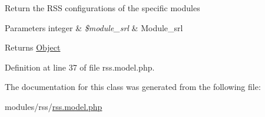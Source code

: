 Return the R\+SS configurations of the specific modules


\begin{DoxyParams}[1]{Parameters}
integer & {\em \$module\+\_\+srl} & Module\+\_\+srl \\
\hline
\end{DoxyParams}
\begin{DoxyReturn}{Returns}
\hyperlink{classObject}{Object} 
\end{DoxyReturn}


Definition at line 37 of file rss.\+model.\+php.



The documentation for this class was generated from the following file\+:\begin{DoxyCompactItemize}
\item 
modules/rss/\hyperlink{rss_8model_8php}{rss.\+model.\+php}\end{DoxyCompactItemize}
